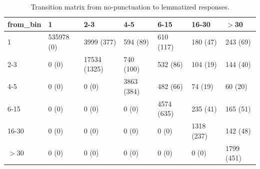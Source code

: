 \begin{table}[H]
\centering
\caption{Transition matrix from no-punctuation to lemmatized responses.} 
\label{tab:tab-2-3}
\begin{tabular}{lllllll}
  \hline
from\_bin & 1 & 2-3 & 4-5 & 6-15 & 16-30 & $>$30 \\ 
  \hline
1 & 535978 (0) & 3999 (377) & 594 (89) & 610 (117) & 180 (47) & 243 (69) \\ 
  2-3 & 0 (0) & 17534 (1325) & 740 (100) & 532 (86) & 104 (19) & 144 (40) \\ 
  4-5 & 0 (0) & 0 (0) & 3863 (384) & 482 (66) & 74 (19) & 60 (20) \\ 
  6-15 & 0 (0) & 0 (0) & 0 (0) & 4574 (635) & 235 (41) & 165 (51) \\ 
  16-30 & 0 (0) & 0 (0) & 0 (0) & 0 (0) & 1318 (237) & 142 (48) \\ 
  $>$30 & 0 (0) & 0 (0) & 0 (0) & 0 (0) & 0 (0) & 1799 (451) \\ 
   \hline
\end{tabular}
\end{table}
